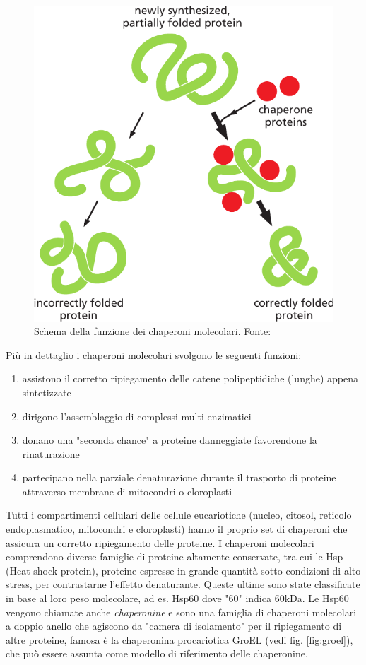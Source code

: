 {\begin{figure}[h]
	\centering
	\includegraphics[scale=0.4]{images/chaperone-alberts.png}
	\caption{Schema della funzione dei chaperoni molecolari. Fonte: \cite{alberts2018essential}}
	\label{fig:chaperoni}
\end{figure}

Più in dettaglio i chaperoni molecolari svolgono le seguenti funzioni:
\begin{enumerate}
	\item assistono il corretto ripiegamento delle catene polipeptidiche (lunghe) appena sintetizzate
	\item dirigono l'assemblaggio di complessi multi-enzimatici
	\item donano una "seconda chance" a proteine danneggiate favorendone la rinaturazione
	\item partecipano nella parziale denaturazione durante il trasporto di proteine attraverso membrane di mitocondri o cloroplasti
\end{enumerate}

Tutti i compartimenti cellulari delle cellule eucariotiche (nucleo, citosol, reticolo endoplasmatico, mitocondri e cloroplasti) hanno il proprio set di chaperoni che assicura un corretto ripiegamento delle proteine. I chaperoni molecolari comprendono diverse famiglie di proteine altamente conservate, tra cui le Hsp (Heat shock protein), proteine espresse in grande quantità sotto condizioni di alto stress, per contrastarne l'effetto denaturante. Queste ultime sono state classificate in base al loro peso molecolare, ad es. Hsp60 dove "60" indica 60kDa. Le Hsp60 vengono chiamate anche \textit{chaperonine} e sono una famiglia di chaperoni molecolari a doppio anello che agiscono da "camera di isolamento" per il ripiegamento di altre proteine\supercite{ranson1998chaperonins}, famosa è la chaperonina procariotica GroEL (vedi fig. \ref{fig:groel}), che può essere assunta come modello di riferimento delle chaperonine. 

}
